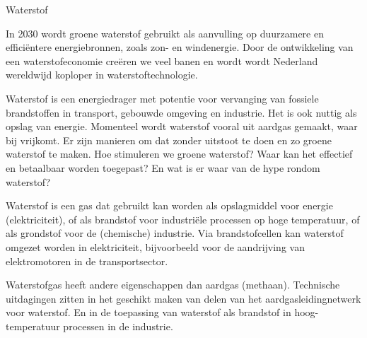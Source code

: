 \begin{voorstel}{Waterstof}


\begin{samenvatting}
In 2030 wordt groene waterstof gebruikt als aanvulling op duurzamere en efficiëntere energiebronnen, zoals zon- en windenergie. Door de ontwikkeling van een waterstofeconomie creëren we veel banen en wordt wordt Nederland wereldwijd koploper in waterstoftechnologie.
\end{samenvatting}

\begin{multicols*}{2}

\begin{uitdaging}
Waterstof is een energiedrager met potentie voor vervanging van fossiele brandstoffen in transport, gebouwde omgeving en industrie. Het is ook nuttig als opslag van energie. Momenteel wordt waterstof vooral uit aardgas gemaakt, waar \COO bij vrijkomt. Er zijn manieren om dat zonder uitstoot te doen en zo groene waterstof te maken. Hoe stimuleren we groene waterstof? Waar kan het effectief en betaalbaar worden toegepast? En wat is er waar van de hype rondom waterstof?
\end{uitdaging}

\begin{overwegingen}


Waterstof is een gas dat gebruikt kan worden als opslagmiddel voor energie (elektriciteit), of als brandstof voor industriële processen op hoge temperatuur, of als grondstof voor de (chemische) industrie. Via brandstofcellen kan waterstof omgezet worden in elektriciteit, bijvoorbeeld voor de aandrijving van elektromotoren in de transportsector.

Waterstofgas heeft andere eigenschappen dan aardgas (methaan). Technische uitdagingen zitten in het geschikt maken van delen van het aardgasleidingnetwerk voor waterstof. En in de toepassing van waterstof als brandstof in hoog-temperatuur processen in de industrie.


\end{overwegingen}
\end{multicols*}
\end{voorstel}

